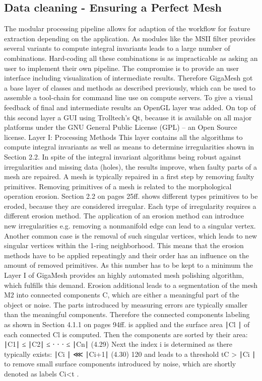 \documentclass{article}
\begin{document}
\subsection{Data cleaning - Ensuring a Perfect Mesh}
The modular processing pipeline allows for adaption of the workflow for feature extraction depending on the application. As modules like the MSII filter provides several variants to compute integral invariants leads to a large number of combinations. Hard-coding all these combinations is as impracticable as asking an user to implement their own pipeline. The compromise is to provide an user interface including visualization of intermediate results.
Therefore GigaMesh got a base layer of classes and methods as described previously, which can be used to assemble a tool-chain for command line use on compute servers. To give a visual feedback of final and intermediate results an OpenGL layer was added. On top of this second layer a GUI using Trolltech’s Qt, because it is available on all major platforms under the GNU General Public License (GPL) – an Open Source license.
Layer I: Processing Methods
This layer contains all the algorithms to compute integral invariants as well as means to determine irregularities shown in Section 2.2. In spite of the integral invariant algorithms being robust against irregularities and missing data (holes), the results improve, when faulty parts of a mesh are repaired. A mesh is typically repaired in a first step by removing faulty primitives.
Removing primitives of a mesh is related to the morphological operation erosion. Section 2.2 on pages 25ff. shows different types primitives to be eroded, because they are considered irregular. Each type of irregularity requires a different erosion method. The application of an erosion method can introduce new irregularities e.g. removing a nonmanifold edge can lead to a singular vertex. Another common case is the removal of such singular vertices, which leads to new singular vertices within the 1-ring neighborhood. This means that the erosion methods have to be applied repeatingly and their order has an influence on the amount of removed primitives. As this number has to be kept to a minimum the Layer I of GigaMesh provides an highly automated mesh polishing algorithm, which fulfills this demand. Erosion additional leads to a segmentation of the mesh M2 into connected components C, which are either a meaningful part of the object or noise. The parts introduced by measuring errors are typically smaller than the meaningful components.
Therefore the connected components labeling as shown in Section 4.1.1 on pages 94ff. is applied and the surface area ∣Cl ∣ of each connected Cl is computed. Then the components are sorted by their area: ∣C1∣ ≤ ∣C2∣ ≤ ⋅ ⋅ ⋅ ≤ ∣Cn∣ (4.29) Next the index i is determined as there typically exists: ∣Ci ∣ ⋘ ∣Ci+1∣ (4.30) 120 and leads to a threshold tC > ∣Ci ∣ to remove small surface components introduced by noise, which are shortly denoted as labels Ci<t .
\end{document}
